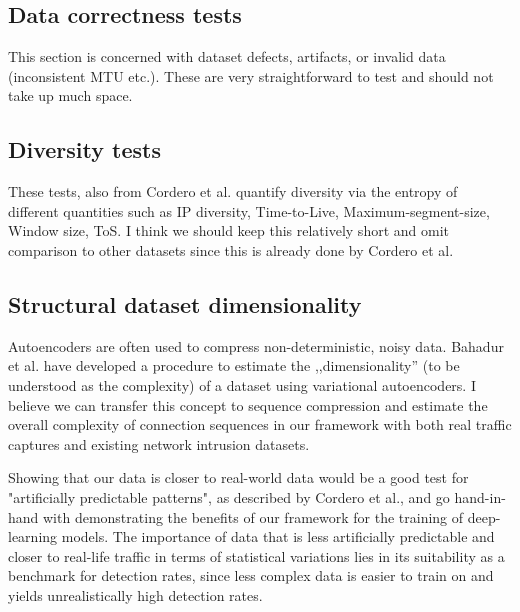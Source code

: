\documentclass{article}
\begin{document}
\subsection{Data correctness tests}

This section is concerned with dataset defects, artifacts, or invalid data (inconsistent MTU etc.). These are very straightforward to test and should not take up much space. 


\subsection{Diversity tests}

These tests, also from Cordero et al. quantify diversity via the entropy of different quantities such as IP diversity, Time-to-Live, Maximum-segment-size, Window size, ToS. I think we should keep this relatively short and omit comparison to other datasets since this is already done by Cordero et al. 


\subsection{Structural dataset dimensionality}



Autoencoders are often used to compress non-deterministic, noisy data. Bahadur et al. have developed a procedure to estimate the ,,dimensionality'' (to be understood as the complexity) of a dataset using variational autoencoders. I believe we can transfer this concept to sequence compression and estimate the overall complexity of connection sequences in our framework with both real traffic captures and existing network intrusion datasets. 

Showing that our data is closer to real-world data would be a good test for "artificially predictable patterns", as described by Cordero et al., and go hand-in-hand with demonstrating the benefits of our framework for the training of deep-learning models. The importance of data that is less artificially predictable and closer to real-life traffic in terms of statistical variations lies in its suitability as a benchmark for detection rates, since less complex data is easier to train on and yields unrealistically high detection rates. 


\end{document}
